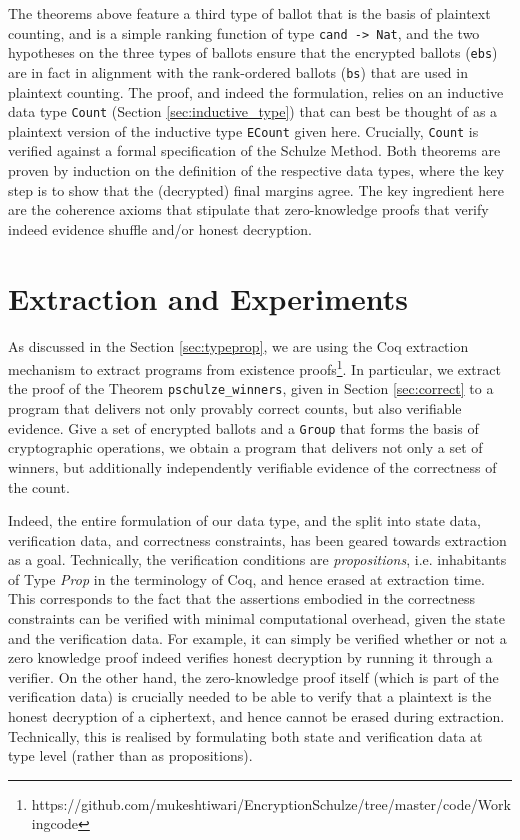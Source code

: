 \noindent
The theorems above feature a third type of ballot that is the basis
of plaintext counting, and is a simple ranking function of type
\texttt{cand -> Nat}, and the two hypotheses on the three types of
ballots ensure that the encrypted ballots (\texttt{ebs}) are in fact
in alignment with the rank-ordered ballots (\texttt{bs}) that are
used in plaintext counting. The proof, and indeed the formulation, 
relies on an inductive data
type \texttt{Count}  (Section \ref{sec:inductive_type}) that can best be 
thought of as a plaintext
version of the inductive type  \texttt{ECount} given here.
Crucially, \texttt{Count} is verified against a formal specification
of the Schulze Method. Both theorems are proven by induction on the
definition of the respective data types, where the key step is to
show that the (decrypted) final margins agree. The key ingredient
here are the coherence axioms that stipulate that zero-knowledge
proofs that verify indeed evidence shuffle and/or honest decryption.


\section{Extraction and Experiments} \label{sec:extract}

As discussed in the Section \ref{sec:typeprop}, 
we are using  the Coq extraction
mechanism \citep{Letouzey:2003:NEC}  to extract programs from
existence proofs\footnote{https://github.com/mukeshtiwari/EncryptionSchulze/tree/master/code/Workingcode}.
In particular, we extract the proof of the Theorem
\texttt{pschulze\_winners}, given in Section \ref{sec:correct} to a
program that delivers not only provably correct counts, but also
verifiable evidence.  Give a set of encrypted ballots and a \texttt{Group}
that forms the basis of cryptographic operations, we obtain a program that
delivers not only a set of winners, but additionally independently  verifiable
evidence of the correctness of the count. 

Indeed, the entire formulation of our data type, and the split into
state data, verification data, and correctness constraints, has been
geared towards extraction as a goal. Technically, the verification
conditions are \emph{propositions}, i.e. inhabitants of Type
\emph{Prop} in the terminology of Coq, and hence erased at
extraction time. This corresponds to the fact that the assertions
embodied in the correctness constraints can be verified with minimal
computational overhead, given the state and the verification data.
For example, it can simply be verified whether or not a zero
knowledge proof indeed verifies honest decryption by running
it through a verifier.  On the other hand, the zero-knowledge proof
itself (which is part of the verification data) is crucially needed
to be able to verify that a plaintext is the honest decryption of a
ciphertext, and hence cannot be erased during extraction.
Technically, this is realised by formulating both state and
verification data at type level (rather than as propositions). 

